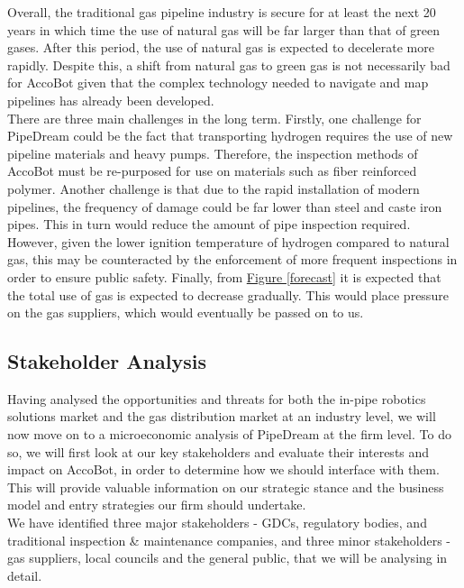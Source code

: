 \documentclass[11pt]{article}		%
\newcommand{\figref}[1]{\hyperref[#1]{Figure \ref*{#1}}}    %
\begin{document}
    		Overall, the traditional gas pipeline industry is secure for at least the next 20 years in which time the use of natural gas will be far larger than that of green gases. After this period, the use of natural gas is expected to decelerate more rapidly. Despite this, a shift from natural gas to green gas is not necessarily bad for AccoBot given that the complex technology needed to navigate and map pipelines has already been developed. 
    		\\
    	    \hspace*{3ex}There are three main challenges in the long term. Firstly, one challenge for PipeDream could be the fact that transporting hydrogen requires the use of new pipeline materials and heavy pumps. Therefore, the inspection methods of AccoBot must be re-purposed for use on materials such as fiber reinforced polymer. Another challenge is that due to the rapid installation of modern pipelines, the frequency of damage could be far lower than steel and caste iron pipes. This in turn would reduce the amount of pipe inspection required. However, given the lower ignition temperature of hydrogen compared to natural gas, this may be counteracted by the enforcement of more frequent inspections in order to ensure public safety. Finally, from \figref{forecast} it is expected that the total use of gas is expected to decrease gradually. This would place pressure on the gas suppliers, which would eventually be passed on to us. 

	\subsection{Stakeholder Analysis}

		Having analysed the opportunities and threats for both the in-pipe robotics solutions market and the gas distribution market at an industry level, we will now move on to a microeconomic analysis of PipeDream at the firm level. To do so, we will first look at our key stakeholders and evaluate their interests and impact on AccoBot, in order to determine how we should interface with them. This will provide valuable information on our strategic stance and the business model and entry strategies our firm should undertake.
		\\
        \hspace*{3ex}We have identified three major stakeholders - GDCs, regulatory bodies, and traditional inspection \& maintenance companies, and three minor stakeholders - gas suppliers, local councils and the general public, that we will be analysing in detail. 
		
\end{document}
